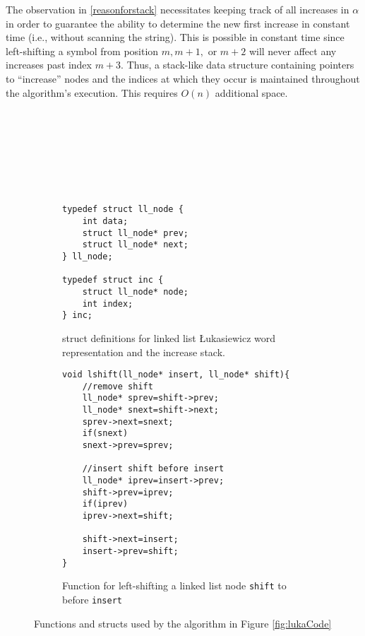 The observation in \ref{reasonforstack} necessitates keeping track of all increases in $\alpha$ in order to guarantee the ability to determine the new first increase in constant time (i.e., without scanning the string).  This is possible in constant time since left-shifting a symbol from position $m,m+1,$ or $m+2$ will never affect any increases past index $m+3$.  Thus, a stack-like data structure containing pointers to ``increase'' nodes and the indices at which they occur is maintained throughout the algorithm's execution.  This requires $O(n)$ additional space.

    
\begin{figure}[H]
    \begin{subfigure}[]{.5\textwidth}
    \begin{center}
        \begin{Verbatim}








typedef struct ll_node {
    int data;
    struct ll_node* prev;
    struct ll_node* next;
} ll_node;

typedef struct inc {
    struct ll_node* node;
    int index;
} inc;
        \end{Verbatim}
            
    \end{center}

    \caption{struct definitions for linked list Łukasiewicz word representation and the increase stack.}
    \label{fig:lukaStruct}
    \end{subfigure}
    \begin{subfigure}[]{.5\textwidth}
    \begin{center}
        \begin{Verbatim}
void lshift(ll_node* insert, ll_node* shift){
    //remove shift
    ll_node* sprev=shift->prev;
    ll_node* snext=shift->next;
    sprev->next=snext;
    if(snext)
	snext->prev=sprev;

    //insert shift before insert
    ll_node* iprev=insert->prev;
    shift->prev=iprev;
    if(iprev)
	iprev->next=shift;

    shift->next=insert;
    insert->prev=shift;
}
        \end{Verbatim}
    \end{center}

\cprotect\caption{Function for left-shifting a linked list node \verb$shift$ to before \verb$insert$}
    \label{fig:lukaHelpers}
    \end{subfigure}

    \caption{Functions and structs used by the algorithm in Figure \ref{fig:lukaCode}}

\end{figure}

